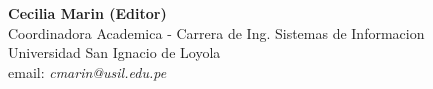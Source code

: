\begin{center}
\textbf{Cecilia Marin (Editor)} \\
Coordinadora Academica - Carrera de Ing. Sistemas de Informacion \\
Universidad San Ignacio de Loyola \\
email: \textit{cmarin@usil.edu.pe} \\
\end{center}
